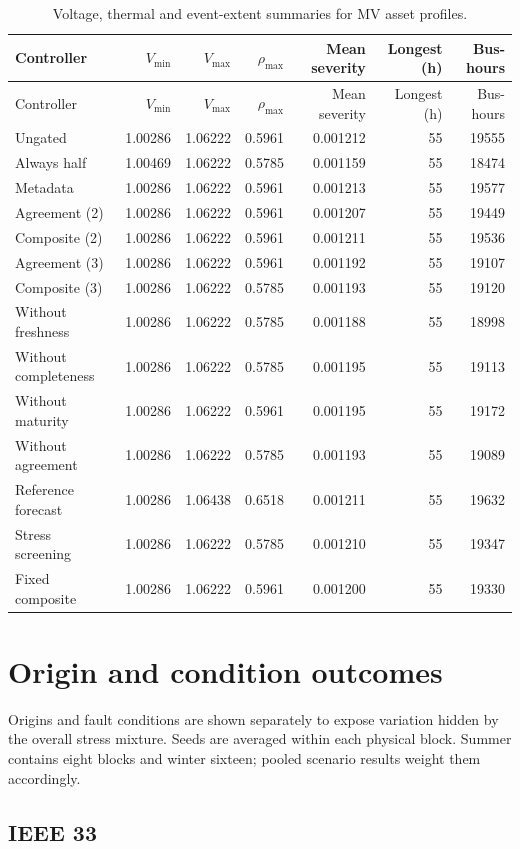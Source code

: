 \documentclass[11pt]{article}
\begin{document}
\small\begin{longtable}{lrrrrrr}
\caption{Voltage, thermal and event-extent summaries for MV asset profiles.}\\\toprule
Controller & $V_{\min}$ & $V_{\max}$ & $\rho_{\max}$ & Mean severity & Longest (h) & Bus-hours\\\midrule
\endfirsthead
\toprule
Controller & $V_{\min}$ & $V_{\max}$ & $\rho_{\max}$ & Mean severity & Longest (h) & Bus-hours\\\midrule
\endhead
\bottomrule\endfoot
Ungated & 1.00286 & 1.06222 & 0.5961 & 0.001212 & 55 & 19555\\
Always half & 1.00469 & 1.06222 & 0.5785 & 0.001159 & 55 & 18474\\
Metadata & 1.00286 & 1.06222 & 0.5961 & 0.001213 & 55 & 19577\\
Agreement (2) & 1.00286 & 1.06222 & 0.5961 & 0.001207 & 55 & 19449\\
Composite (2) & 1.00286 & 1.06222 & 0.5961 & 0.001211 & 55 & 19536\\
Agreement (3) & 1.00286 & 1.06222 & 0.5961 & 0.001192 & 55 & 19107\\
Composite (3) & 1.00286 & 1.06222 & 0.5785 & 0.001193 & 55 & 19120\\
Without freshness & 1.00286 & 1.06222 & 0.5785 & 0.001188 & 55 & 18998\\
Without completeness & 1.00286 & 1.06222 & 0.5785 & 0.001195 & 55 & 19113\\
Without maturity & 1.00286 & 1.06222 & 0.5961 & 0.001195 & 55 & 19172\\
Without agreement & 1.00286 & 1.06222 & 0.5785 & 0.001193 & 55 & 19089\\
Reference forecast & 1.00286 & 1.06438 & 0.6518 & 0.001211 & 55 & 19632\\
Stress screening & 1.00286 & 1.06222 & 0.5785 & 0.001210 & 55 & 19347\\
Fixed composite & 1.00286 & 1.06222 & 0.5961 & 0.001200 & 55 & 19330\\
\end{longtable}\normalsize
\section{Origin and condition outcomes}
Origins and fault conditions are shown separately to expose variation hidden by the overall stress mixture. Seeds are averaged within each physical block. Summer contains eight blocks and winter sixteen; pooled scenario results weight them accordingly.
\subsection{IEEE 33}
\end{document}
